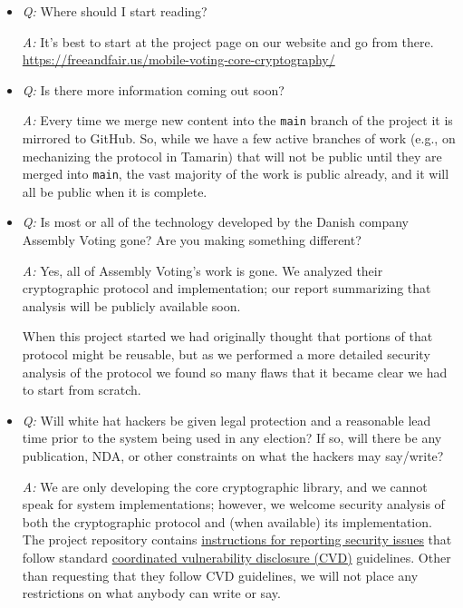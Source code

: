 \documentclass[12pt,letter]{article}
\begin{document}
\begin{itemize}

    \item \emph{Q:} Where should I start reading?

    \emph{A:} It's best to start at the project page on our website and go from there. \\
    \href{https://freeandfair.us/mobile-voting-core-cryptography/}{https://freeandfair.us/mobile-voting-core-cryptography/}

    \item \emph{Q:} Is there more information coming out soon?

    \emph{A:} Every time we merge new content into the \texttt{main} branch of the project it is mirrored to GitHub.  So, while we have a few active branches of work (e.g., on mechanizing the protocol in Tamarin) that will not be public until they are merged into \texttt{main}, the vast majority of the work is public already, and it will all be public when it is complete.

    \item \emph{Q:} Is most or all of the technology developed by the Danish company Assembly Voting gone? Are you making something different?

    \emph{A:} Yes, all of Assembly Voting's work is gone.  We analyzed their cryptographic protocol and implementation; our report summarizing that analysis will be publicly available soon.

    When this project started we had originally thought that portions of that protocol might be reusable, but as we performed a more detailed security analysis of the protocol we found so many flaws that it became clear we had to start from scratch.

    \item \emph{Q:} Will white hat hackers be given legal protection and a reasonable lead time prior to the system being used in any election?  If so, will there be any publication, NDA, or other constraints on what the hackers may say/write?

    \emph{A:} We are only developing the core cryptographic library, and we cannot speak for system implementations; however, we welcome security analysis of both the cryptographic protocol and (when available) its implementation. The project repository contains \href{https://github.com/FreeAndFair/MobileVotingCoreCryptography/blob/main/SECURITY.md}{instructions for reporting security issues} that follow standard \href{https://en.wikipedia.org/wiki/Coordinated_vulnerability_disclosure}{coordinated vulnerability disclosure (CVD)} guidelines. Other than requesting that they follow CVD guidelines, we will not place any restrictions on what anybody can write or say.

\end{itemize}
\end{document}
